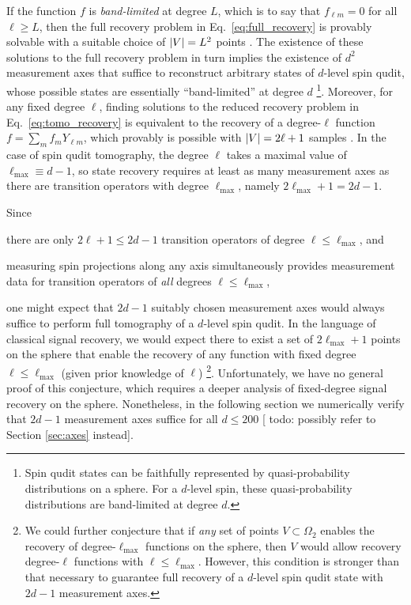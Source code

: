 \documentclass[notitlepage,twocolumn]{revtex4-2}
\renewcommand{\t}{\text} %
\newcommand{\red}[1]{{\color{red} #1}}
\begin{document}
If the function $f$ is {\it band-limited} at degree $L$, which is to say that $f_{\ell m}=0$ for all $\ell\ge L$, then the full recovery problem in Eq.~\eqref{eq:full_recovery} is provably solvable with a suitable choice of $\abs{V}=L^2$ points \cite{freeden2008spherical, freeden2018spherical}.
The existence of these solutions to the full recovery problem in turn implies the existence of $d^2$ measurement axes that suffice to reconstruct arbitrary states of $d$-level spin qudit, whose possible states are essentially ``band-limited'' at degree $d$ \footnote{Spin qudit states can be faithfully represented by quasi-probability distributions on a sphere.  For a $d$-level spin, these quasi-probability distributions are band-limited at degree $d$.}.
Moreover, for any fixed degree $\ell$, finding solutions to the reduced recovery problem in Eq.~\eqref{eq:tomo_recovery} is equivalent to the recovery of a degree-$\ell$ function $f = \sum_m f_m Y_{\ell m}$, which provably is possible with $\abs{V}=2\ell+1$ samples \cite{freeden2008spherical}.
In the case of spin qudit tomography, the degree $\ell$ takes a maximal value of $\ell_{\t{max}}\equiv d-1$, so state recovery requires at least as many measurement axes as there are transition operators with degree $\ell_{\t{max}}$, namely $2\ell_{\t{max}}+1=2d-1$.

Since
\begin{enumerate*}
\item there are only $2\ell+1\le2d-1$ transition operators of degree $\ell\le\ell_{\t{max}}$, and
\item measuring spin projections along any axis simultaneously provides measurement data for transition operators of {\it all} degrees $\ell\le\ell_{\t{max}}$,
\end{enumerate*}
one might expect that $2d-1$ suitably chosen measurement axes would always suffice to perform full tomography of a $d$-level spin qudit.
In the language of classical signal recovery, we would expect there to exist a set of $2\ell_{\t{max}}+1$ points on the sphere that enable the recovery of any function with fixed degree $\ell\le\ell_{\t{max}}$ (given prior knowledge of $\ell$) \footnote{We could further conjecture that if {\it any} set of points $V\subset\Omega_2$ enables the recovery of degree-$\ell_{\t{max}}$ functions on the sphere, then $V$ would allow recovery degree-$\ell$ functions with $\ell\le\ell_{\t{max}}$.  However, this condition is stronger than that necessary to guarantee full recovery of a $d$-level spin qudit state with $2d-1$ measurement axes.}.
Unfortunately, we have no general proof of this conjecture, which requires a deeper analysis of fixed-degree signal recovery on the sphere.
Nonetheless, in the following section we numerically verify that $2d-1$ measurement axes suffice for all $d\le200$ [\red{todo: possibly refer to Section \ref{sec:axes} instead}].
\end{document}
